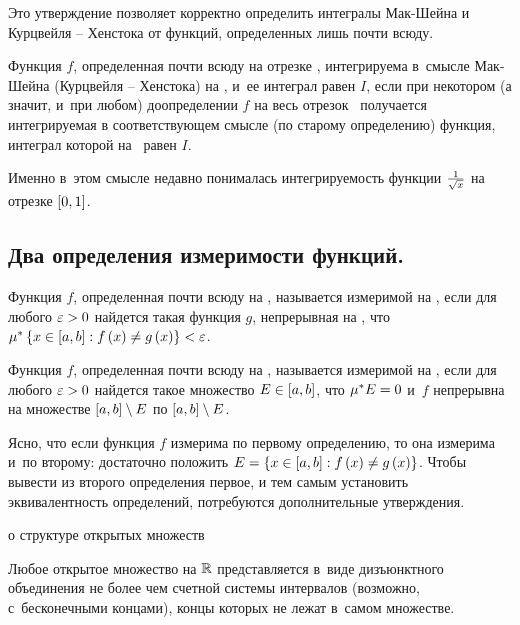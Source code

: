 \documentclass[draft]{article}
\begin{document}
Это утверждение позволяет корректно определить интегралы Мак-Шейна и
Курцвейля -- Хенстока от функций, определенных лишь почти всюду.

\bigskip

\df Функция $f$, определенная почти всюду на отрезке \ab,
интегрируема в~смысле Мак-Шейна (Курцвейля -- Хенстока) на \ab, и~ее
интеграл равен $I$, если при некотором (а значит, и~при любом)
доопределении $f$ на весь отрезок \ab\ получается интегрируемая в
соответствующем смысле (по старому определению) функция, интеграл
которой на \ab\ равен $I$.

\bigskip

{\small\rem

Именно в~этом смысле недавно понималась интегрируемость функции
$1\over\sqrt{x}$ на отрезке $\seg[0,1]$.}

\bigskip



\subsection{Два определения измеримости функций.}

 Функция $f$, определенная почти всюду на \ab, называется
измеримой на \ab, если для любого $\varepsilon > 0$ найдется такая функция
$g$, непрерывная на \ab, что $\mes\set{x\in\segab:f\atx\neq
g\atx}<\ep$.

 Функция $f$, определенная почти всюду на \ab, называется
измеримой на \ab, если для любого $\varepsilon > 0$ найдется такое множество
$E\in\segab$, что $\mu^* E=0$ и~$f$ непрерывна на множестве
$\segab\setminus E$ по $\segab\setminus E$.

\bigskip

\eqdf

Ясно, что если функция $f$ измерима по первому определению, то она
измерима и~по второму: достаточно положить $E=\set{x\in\segab:
f\atx\neq g\atx}$. Чтобы вывести из второго определения первое, и
тем самым установить эквивалентность определений, потребуются
дополнительные утверждения.

\bigskip

 {о структуре открытых множеств}

Любое открытое множество на $\mathbb{R}$ представляется в~виде
дизъюнктного объединения не более чем счетной системы интервалов
(возможно, с~бесконечными концами), концы которых не лежат в~самом
множестве.
\end{document}
